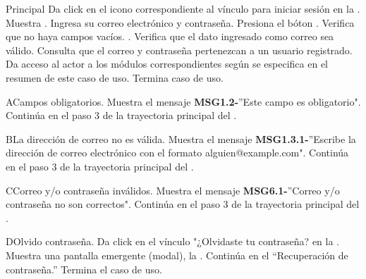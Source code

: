 	\newpage
	\begin{UCtrayectoria}{Principal}
	\UCpaso[\UCactor] Da click en el icono correspondiente al vínculo para iniciar sesión en la .	
	\UCpaso Muestra .
	\UCpaso[\UCactor] Ingresa su correo electrónico y contraseña. 
	\UCpaso[\UCactor] Presiona el bóton .
	\UCpaso Verifica que no haya campos vacíos. .
	\UCpaso Verifica que el dato ingresado como correo sea válido. 
	\UCpaso Consulta que el correo y contraseña pertenezcan a un usuario registrado. 
	\UCpaso Da acceso al actor a los módulos correspondientes según se especifica en el resumen de este caso de uso.  
	Termina caso de uso.
\end{UCtrayectoria}

	\begin{UCtrayectoriaA}{A}{Campos obligatorios.}
		\UCpaso Muestra el mensaje {\bf MSG1.2-}''Este campo es obligatorio".
		\UCpaso Continúa en el paso 3 de la trayectoria principal del .
	\end{UCtrayectoriaA}

	\begin{UCtrayectoriaA}{B}{La dirección de correo no es válida.}
		\UCpaso Muestra el mensaje {\bf MSG1.3.1-}''Escribe la dirección de correo electrónico con el formato alguien@example.com".
		\UCpaso Continúa en el paso 3 de la trayectoria principal del .
	\end{UCtrayectoriaA}	
	
	\begin{UCtrayectoriaA}{C}{Correo y/o contraseña inválidos.}
		\UCpaso Muestra el mensaje {\bf MSG6.1-}''Correo y/o contraseña no son correctos".
		\UCpaso Continúa en el paso 3 de la trayectoria principal del .
	\end{UCtrayectoriaA}
	
	\begin{UCtrayectoriaA}{D}{Olvido contraseña.}
		\UCpaso[\UCactor] Da click en el vínculo "¿Olvidaste tu contraseña? en la .	
		\UCpaso Muestra una pantalla emergente (modal), la .
		\UCpaso Continúa en el ``Recuperación de contraseña.'' 
		\UCpaso Termina el caso de uso.
	\end{UCtrayectoriaA}
	

